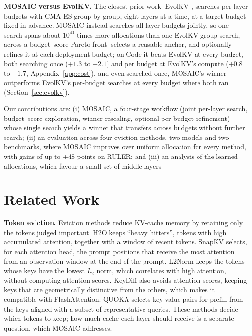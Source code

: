 \documentclass[11pt]{article}
\begin{document}
\textbf{MOSAIC versus EvolKV.}\label{sec:intro-evolkv} The closest prior work, EvolKV \citep{yu2025evolkv}, searches per-layer budgets with CMA-ES group by group, eight layers at a time, at a target budget fixed in advance. MOSAIC instead searches all layer budgets jointly, so one search spans about $10^{40}$ times more allocations than one EvolKV group search, across a budget--score Pareto front, selects a reusable anchor, and optionally refines it at each deployment budget; on Code it beats EvolKV at every budget, both searching once ($+1.3$ to $+2.1$) and per budget at EvolKV's compute ($+0.8$ to $+1.7$, Appendix~\ref{app:cost}), and even searched once, MOSAIC's winner outperforms EvolKV's per-budget searches at every budget where both ran (Section~\ref{sec:evolkv}).

Our contributions are: (i) MOSAIC, a four-stage workflow (joint per-layer search, budget--score exploration, winner rescaling, optional per-budget refinement) whose single search yields a winner that transfers across budgets without further search; (ii) an evaluation across four eviction methods, two models and two benchmarks, where MOSAIC improves over uniform allocation for every method, with gains of up to +48 points on RULER; and (iii) an analysis of the learned allocations, which favour a small set of middle layers.

\section{Related Work}

\textbf{Token eviction.} Eviction methods reduce KV-cache memory by retaining only the tokens judged important. H2O \citep{zhang2023h2o} keeps ``heavy hitters'', tokens with high accumulated attention, together with a window of recent tokens. SnapKV \citep{li2024snapkv} selects, for each attention head, the prompt positions that receive the most attention from an observation window at the end of the prompt. L2Norm \citep{devoto2024l2norm} keeps the tokens whose keys have the lowest $L_2$ norm, which correlates with high attention, without computing attention scores. KeyDiff \citep{park2025keydiff} also avoids attention scores, keeping keys that are geometrically distinctive from the others, which makes it compatible with FlashAttention. QUOKA \citep{jones2026quoka} selects key-value pairs for prefill from the keys aligned with a subset of representative queries. These methods decide which tokens to keep; how much cache each layer should receive is a separate question, which MOSAIC addresses.
\end{document}
